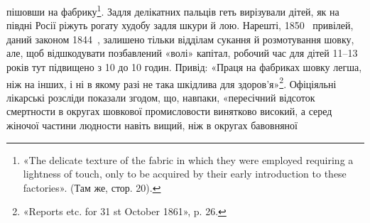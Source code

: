 \parcont{}  %
пішовши на фабрику\footnote{
«The delicate texture of the fabric in which they were employed
requiring a lightness of touch, only to be acquired by their early introduction
to these factories». (Там же, стор. 20).
}. Задля делікатних пальців геть вирізували
дітей, як на півдні Росії ріжуть рогату худобу задля шкури
й лою. Нарешті, 1850~ привілей, даний законом 1844~, залишено
тільки відділам сукання й розмотування шовку, але, щоб
відшкодувати позбавлений «волі» капітал, робочий час для дітей
11--13 років тут підвищено з 10 до 10 годин. Привід: «Праця
на фабриках шовку легша, ніж на інших, і ні в якому разі не така
шкідлива для здоров’я»\footnote{
«Reports etc. for 31 st October 1861», p. 26.
}. Офіціяльні лікарські розсліди показали
згодом, що, навпаки, «пересічний відсоток смертности в
округах шовкової промисловости винятково високий, а серед жіночої
частини людности навіть вищий, ніж в округах бавовняної
